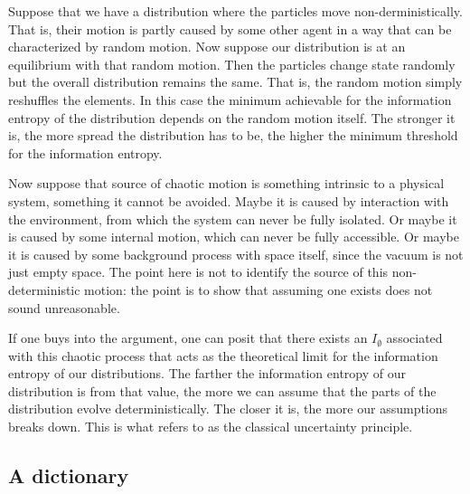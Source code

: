 \documentclass[11pt]{article}
\begin{document}
Suppose that we have a distribution where the particles move non-derministically. That is, their motion is partly caused by some other agent in a way that can be characterized by random motion. Now suppose our distribution is at an equilibrium with that random motion. Then the particles change state randomly but the overall distribution remains the same. That is, the random motion simply reshuffles the elements. In this case the minimum achievable for the information entropy of the distribution depends on the random motion itself. The stronger it is, the more spread the distribution has to be, the higher the minimum threshold for the information entropy.

Now suppose that source of chaotic motion is something intrinsic to a physical system, something it cannot be avoided. Maybe it is caused by interaction with the environment, from which the system can never be fully isolated. Or maybe it is caused by some internal motion, which can never be fully accessible. Or maybe it is caused by some background process with space itself, since the vacuum is not just empty space. The point here is not to identify the source of this non-deterministic motion: the point is to show that assuming one exists does not sound unreasonable.

If one buys into the argument, one can posit that there exists an $I_\emptyset$ associated with this chaotic process that acts as the theoretical limit for the information entropy of our distributions. The farther the information entropy of our distribution is from that value, the more we can assume that the parts of the distribution evolve deterministically. The closer it is, the more our assumptions breaks down. This is what \cite{AoPPhy1} refers to as the classical uncertainty principle.

\subsection*{A dictionary}
\end{document}
